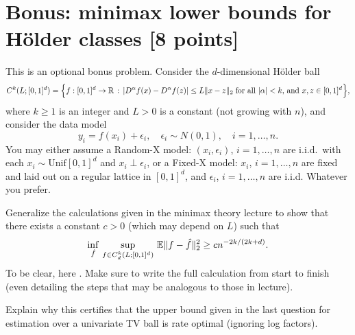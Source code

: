 \documentclass{article}
\begin{document}
\section{Bonus: minimax lower bounds for H{\"o}lder classes [8 points]}  

This is an optional bonus problem. Consider the $d$-dimensional H{\"o}lder ball    
\[
C^k(L; [0,1]^d) = \Big\{ f : [0,1]^d \to \mathbb{R} \,:\, | D^\alpha f (x) - D^\alpha
f(z) | \leq L \|x-z\|_2 \; \text{for all $|\alpha| < k$, and $x,z \in [0,1]^d$}
\Big\},  
\]
where $k \geq 1$ is an integer and $L>0$ is a constant (not growing with $n$),
and consider the data model 
\[
y_i = f(x_i) + \epsilon_i, \quad \epsilon_i \sim N(0,1), \quad i=1,\dots,n. 
\]
You may either assume a Random-X model: $(x_i,\epsilon_i)$, $i=1,\dots,n$ are 
i.i.d.\ with each $x_i \sim \mathrm{Unif}[0,1]^d$ and $x_i \perp \epsilon_i$,
or a Fixed-X model: $x_i$, $i=1,\dots,n$ are fixed and laid out on a regular
lattice in $[0,1]^d$, and $\epsilon_i$, $i=1,\dots,n$ are i.i.d. Whatever you
prefer.   

Generalize the calculations given in the minimax theory lecture to show that
there exists a constant $c>0$ (which may depend on $L$) such that
\[
\inf_{\hat{f}} \, \sup_{f \in C^k_d(L; [0,1]^d)} \, \mathbb{E} \|f - \hat{f} \|_2^2 \geq
c n^{-2k/(2k+d)}. 
\]
To be clear, here . Make sure
to write the full calculation from start to finish (even detailing the steps
that may be analogous to those in lecture).
\marginpar{\small [7 pts]}

Explain why this certifies that the upper bound given in the last question for
estimation over a univariate TV ball is rate optimal (ignoring log factors). 
\marginpar{\small [1 pt]}



\end{document}
